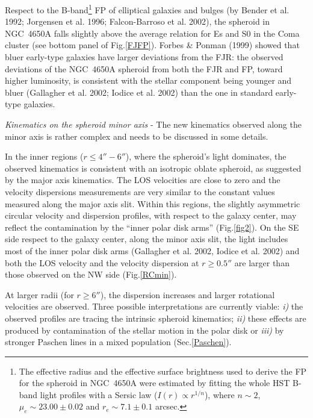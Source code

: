 \documentclass[12pt,preprint]{aastex}
\begin{document}
Respect to the B-band\footnote{The effective radius and the effective
surface brightness used to derive the FP for the spheroid in NGC~4650A were
estimated by fitting the whole HST B-band light profiles with a Sersic
law ($I(r)\propto r^{1/n}$), where $n \sim 2$, $\mu_e \sim 23.00 \pm
0.02$ and $r_e \sim 7.1 \pm 0.1$ arcsec.}  FP of elliptical galaxies
and bulges (by Bender et al. 1992; Jorgensen et al. 1996;
Falcon-Barroso et al. 2002), the spheroid in NGC~4650A falls slightly
above the average relation for Es and S0 in the Coma cluster (see
bottom panel of Fig.\ref{FJFP}). Forbes \& Ponman (1999) showed that
bluer early-type galaxies have larger deviations from the FJR: the
observed deviations of the NGC~4650A spheroid from both the FJR and
FP, toward higher luminosity, is consistent with the stellar component
being younger and bluer (Gallagher et al. 2002; Iodice et al. 2002)
than the one in standard early-type galaxies.

{\it Kinematics on the spheroid minor axis} - The new kinematics
observed along the minor axis is rather complex and needs to be
discussed in some details.

In the inner regions ($r\le 4''-6''$), where the spheroid's light
dominates, the observed kinematics is consistent with an isotropic
oblate spheroid, as suggested by the major axis kinematics. The LOS
velocities are close to zero and the velocity dispersions measurements
are very similar to the constant values measured along the major axis
slit. Within this regions, the slightly asymmetric circular velocity
and dispersion profiles, with respect to the galaxy center, may
reflect the contamination by the ``inner polar disk arms''
(Fig.\ref{fig2}). On the SE side respect to the galaxy center, along
the minor axis slit, the light includes most of the inner polar disk
arms (Gallagher et al. 2002, Iodice et al. 2002) and both the LOS
velocity and the velocity dispersion at $r \ge 0.5''$ are larger than
those observed on the NW side (Fig.\ref{RCmin}).

At larger radii (for $r \ge 6''$), the dispersion increases and larger
rotational velocities are observed. Three possible interpretations are
currently viable: {\it i)} the observed profiles are tracing the
intrinsic spheroid kinematics; {\it ii)} these effects are produced by
contamination of the stellar motion in the polar disk or {\it iii)} by
stronger Paschen lines in a mixed population (Sec.\ref{Paschen}).
\end{document}
